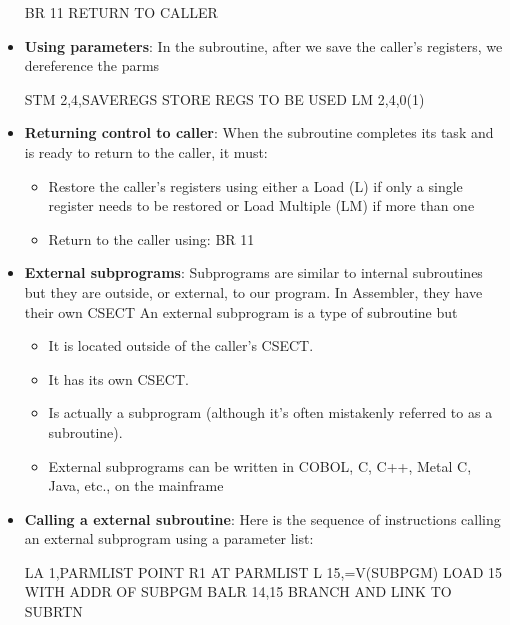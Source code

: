 \documentclass{report}
\begin{document}
\begin{itemize}
\begin{cppcode}
            BR 11 RETURN TO CALLER
            \end{cppcode}
        \item \textbf{Using parameters}: In the subroutine, after we save the caller's registers, we dereference the parms
            \bigbreak \noindent 
            \begin{cppcode}
                STM   2,4,SAVEREGS   STORE REGS TO BE USED
                LM    2,4,0(1)
            \end{cppcode}
        \item \textbf{Returning control to caller}: When the subroutine completes its task and is ready to return to the caller, it must:
            \bigbreak \noindent 
            \begin{itemize}
                \item Restore the caller's registers using either a Load (L) if only a single register needs to be restored or Load Multiple (LM) if more than one
                \item Return to the caller using: BR 11
            \end{itemize}
        \item \textbf{External subprograms}: Subprograms are similar to internal subroutines but they are outside, or external, to our program. 
            \bigbreak \noindent 
            In Assembler, they have their own CSECT
            \bigbreak \noindent 
            An external subprogram is a type of subroutine but
            \begin{itemize}
                \item It is located outside of the caller's CSECT.
                \item It has its own CSECT.
                \item Is actually a subprogram (although it's often mistakenly referred to as a subroutine).
                \item External subprograms can be written in COBOL, C, C++, Metal C, Java, etc., on the mainframe
            \end{itemize}
        \item \textbf{Calling a external subroutine}:
            Here is the sequence of instructions calling an external subprogram using a parameter list:
            \bigbreak \noindent 
            \begin{cppcode}
                LA   1,PARMLIST    POINT R1 AT PARMLIST
                L    15,=V(SUBPGM) LOAD 15 WITH ADDR OF SUBPGM
                BALR 14,15         BRANCH AND LINK TO SUBRTN

\end{cppcode}
\end{itemize}
\end{document}
